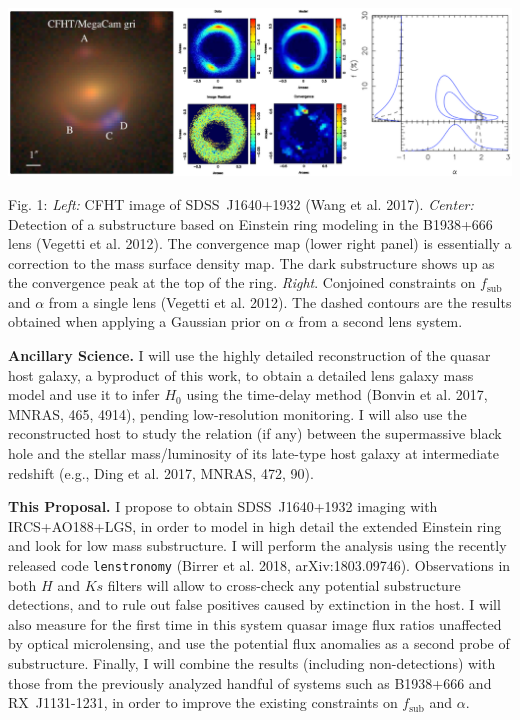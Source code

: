 \documentclass[a4paper,11pt]{article}
\begin{document}
\begin{minipage}{\textwidth}
\includegraphics[width=0.95\hsize]{collage.eps}
\end{minipage}
Fig. 1: {\it Left:} CFHT image of SDSS~J1640+1932 (Wang et al. 2017). {\it Center:} Detection of a substructure based on Einstein ring modeling in the B1938+666 lens (Vegetti et al. 2012). The convergence map (lower right panel) is essentially a correction to the mass surface density map. The dark substructure shows up as the convergence peak at the top of the ring. {\it Right}. Conjoined constraints on $f_\mathrm{sub}$ and $\alpha$ from a single lens (Vegetti et al. 2012). The dashed contours are the results obtained when applying a Gaussian prior on $\alpha$ from a second lens system.

{\bf Ancillary Science.} I will use the highly detailed reconstruction of the quasar host galaxy, a byproduct of this work, to obtain a detailed lens galaxy mass model and use it to infer $H_0$ using the time-delay method (Bonvin et al. 2017, MNRAS, 465, 4914), pending low-resolution monitoring. I will also use the reconstructed host  to study the relation (if any) between the supermassive black hole and the stellar mass/luminosity of its late-type host galaxy at intermediate redshift (e.g., Ding et al. 2017, MNRAS, 472, 90). 

{\bf This Proposal.} I propose to obtain SDSS~J1640+1932 imaging with IRCS+AO188+LGS, in order to model in high detail the extended Einstein ring and look for low mass substructure. I will perform the analysis using the recently released code \texttt{lenstronomy} (Birrer et al. 2018, arXiv:1803.09746). Observations in both $H$ and $Ks$ filters will allow to cross-check any potential substructure detections, and to rule out false positives caused by extinction in the host. I will also measure for the first time in this system quasar image flux ratios unaffected by optical microlensing, and use the potential flux anomalies as a second probe of substructure. Finally, I will combine the results (including non-detections) with those from the previously analyzed handful of systems such as B1938+666 and RX~J1131-1231, in order to improve the existing constraints on $f_\mathrm{sub}$ and $\alpha$.
\end{document}
